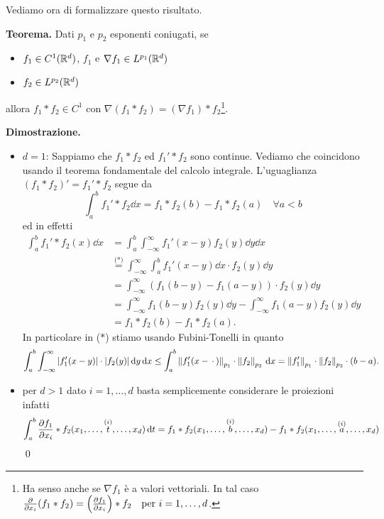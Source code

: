 Vediamo ora di formalizzare questo risultato.

\textbf{Teorema.}
Dati $p_1$ e $p_2$ esponenti coniugati, se

\begin{itemize}
	\item $f_1 \in C^1(\mathbb R^d)$, $f_1$ e $\nabla f_1 \in L^{p_1}(\mathbb R^d)$

	\item $f_2 \in L^{p_2}(\mathbb R^d)$ 
\end{itemize}

allora $f_1 \ast f_2 \in C^1$ con $\nabla(f_1 \ast f_2) = (\nabla f_1) \ast f_2$\footnote{Ha senso anche se $\nabla f_1$ è a valori vettoriali. In tal caso  $\frac{\partial}{\partial x_i}(f_1 \ast f_2) = \left( \frac{\partial f_1}{\partial x_i} \right) \ast f_2 
		\quad \text{per } i = 1, \dots, d $.}. 

\textbf{Dimostrazione.}
\begin{itemize}
	\item $d = 1$:
		Sappiamo che $f_1 \ast f_2$ ed $f_1' \ast f_2$ sono continue. Vediamo che coincidono usando il teorema fondamentale del calcolo integrale. L'uguaglianza $(f_1 \ast f_2)' = f_1' \ast f_2$ segue da
		$$
		\int_a^b f_1' \ast f_2 \dd x = f_1 \ast f_2(b) - f_1 \ast f_2(a)
		\quad \forall a < b
		$$
		ed in effetti
		$$
		\begin{aligned}
			\int_a^b f_1' \ast f_2 (x) \dd x
			&= \int_a^b \int_{-\infty}^\infty f_1'(x - y) f_2(y) \dd y \dd x \\
			&\overset{\text{($*$)}}{=} \int_{-\infty}^\infty \int_a^b f_1'(x - y) \dd x \cdot f_2(y) \dd y \\
			&= \int_{-\infty}^\infty (f_1(b - y) - f_1(a - y)) \cdot f_2(y) \dd y \\
			&= \int_{-\infty}^\infty f_1(b - y) f_2(y) \dd y - \int_{-\infty}^\infty f_1(a - y) f_2(y) \dd y \\
			&= f_1 \ast f_2(b) - f_1 \ast f_2(a).
		\end{aligned}
		$$
		In particolare in ($*$) stiamo usando Fubini-Tonelli in quanto
		$$
		\int_a^b \int_{-\infty}^\infty |f_1'(x-y)| \cdot |f_2(y)| \,\mathrm{d} y \,\mathrm{d} x
		\leq \int_a^b \left\lVert f_1'(x - \,\cdot\,) \right\rVert_{p_1} \cdot \left\lVert f_2 \right\rVert_{p_2} \,\mathrm{d} x 
		= \left\lVert f_1' \right\rVert_{p_1} \cdot \left\lVert f_2 \right\rVert_{p_2} \cdot (b - a).
		$$

	\item
		per $d > 1$ dato $i = 1, \dots, d$ basta semplicemente considerare le proiezioni infatti
		$$
		\int_a^b \frac{\partial f_1}{\partial x_i} \ast f_2 (x_1, \dots, \overset{\text{($i$)}}{t}, \dots, x_d) \,\mathrm{d} t
		= f_1 \ast f_2 (x_1, \dots, \overset{\text{($i$)}}{b}, \dots, x_d) - f_1 \ast f_2 (x_1, \dots, \overset{\text{($i$)}}{a}, \dots, x_d)
		$$
		\qed
\end{itemize}

